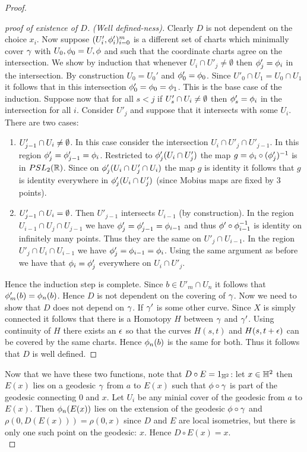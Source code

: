 \begin{proof}
\begin{itemize}
\begin{proof}[proof of existence of $D$]
        \textit{(Well defined-ness).} Clearly $D$ is not dependent on the choice $x_i$. Now suppose $(U'_i,\phi'_i)_{i=0}^m$ is a different set of charts which minimally cover $\gamma$ with $U_0,\phi_0 = U,\phi$ and such that the coordinate charts agree on the intersection. We show by induction that whenever $U_i\cap U'_j\neq \emptyset$ then $\phi'_j = \phi_i$ in the intersection. By construction $U_0 = U_0'$ and $\phi'_0 = \phi_0$. Since $U'_0\cap U_1 = U_0\cap U_1$ it follows that in this intersection $\phi'_0 = \phi_0 = \phi_1$. This is the base case of the induction. Suppose now that for all $s<j$  if $U'_s\cap U_i \neq \emptyset$ then $\phi'_s = \phi_i$ in the intersection for all $i$. Consider $U'_j$ and suppose that it intersects with some $U_i$. There are two cases:
        \begin{enumerate}
          \item $U'_{j-1}\cap U_i\neq \emptyset$. In this case consider the intersection $U_i\cap U'_j\cap U'_{j-1}$. In this region $\phi'_j= \phi'_{j-1} = \phi_i$. Restricted to $\phi'_j (U_i \cap U'_j)$ the map $g = \phi_i\circ (\phi'_j)^{-1}$ is in $PSL_2(\mathbb{R})$. Since on $\phi'_j (U_i \cap U'_j \cap U_i)$ the map $g$ is identity it follows that $g$ is identity everywhere in $\phi'_j(U_i\cap U'_j)$ (since Mobius maps are fixed by $3$ points). 
          \item $U'_{j-1}\cap U_i = \emptyset$. Then $U'_{j-1}$ intersects $U_{i-1}$ (by construction). In the region $U_{i-1} \cap U_j\cap U_{j-1}$ we have $\phi'_j = \phi'_{j-1} = \phi_{i-1}$ and thus $\phi'\circ \phi^{-1}_{i-1}$ is identity on infinitely many points. Thus they are the same on $U'_j\cap U_{i-1}$. In the region $U'_j\cap U_i \cap U_{i-1}$ we have $\phi'_j = \phi_{i-1} = \phi_i$. Using the same argument as before we have that $\phi_i = \phi'_j$ everywhere on $U_i \cap U'_j$.
        \end{enumerate}
        Hence the induction step is complete. Since $b\in U'_m\cap U_n$ it follows that $\phi'_m(b) = \phi_n(b)$. Hence $D$ is not dependent on the covering of $\gamma$. Now we need to show that $D$ does not depend on $\gamma$. If $\gamma'$ is some other curve. Since $X$ is simply connected it follows that there is a Homotopy $H$ between $\gamma$ and $\gamma'$. Using continuity of $H$ there exists an $\epsilon$ so that the curves $H(s,t)$ and $H(s,t+\epsilon)$ can be covered by the same charts. Hence $\phi_n(b)$ is the same for both. Thus it follows that $D$ is well defined.
      \end{proof}
  \end{itemize}
  Now that we have these two functions, note that $D\circ E = 1_{\mathbb{H}^2}$: let $x\in \mathbb{H}^2$ then $E(x)$ lies on a geodesic $\gamma$ from $a$ to $E(x)$ such that $\phi\circ \gamma$ is part of the geodesic connecting $0$ and $x$. Let $U_i$ be any minial cover of the geodesic from $a$ to $E(x)$. Then $\phi_n(E(x))$ lies on the extension of the geodesic $\phi\circ\gamma$ and $\rho(0,D(E(x))) = \rho(0,x)$ since $D$ and $E$ are local isometries, but there is only one such point on the geodesic: $x$. Hence $D\circ E(x) = x$.\\


\end{proof}
